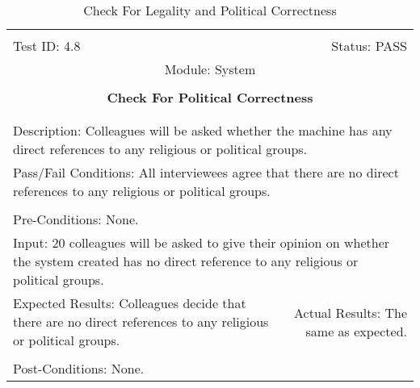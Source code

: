\documentclass[titlepage]{article}
\begin{document}
\begin{center}
\begin{table}[h!]
\begin{tabular}{|l r|}\hline&\\[-2mm]
	Test ID: 4.8	&Status: PASS\\[-3mm]
	\multicolumn{2}{|c|}{Module: System}\\&\\
	\multicolumn{2}{|c|}{\textbf{\large{Check For Political Correctness}}}\\&\\\hline&\\[-3mm]
	\multicolumn{2}{|p{\textwidth}|}{Description: Colleagues will be asked whether the machine has any direct references to any religious or political groups.}\\\hline
	\multicolumn{2}{|p{\textwidth}|}{Pass/Fail Conditions: All interviewees agree that there are no direct references to any religious or political groups.}\\[1mm]\hline&\\[-3mm]
	\multicolumn{2}{|p{\textwidth}|}{Pre-Conditions: None.}\\[4mm]
	\multicolumn{2}{|p{\textwidth}|}{Input: 20 colleagues will be asked to give their opinion on whether the system created has no direct reference to any religious or political groups.}\\[2mm]\hline
	\multicolumn{1}{|p{0.49\textwidth}}{Expected Results: Colleagues decide that there are no direct references to any religious or political groups.}	&\multicolumn{1}{|p{0.45\textwidth}|}{Actual Results: The same as expected.}\\\hline&\\[-3mm]
	\multicolumn{2}{|p{\textwidth}|}{Post-Conditions: None.}\\\hline
\end{tabular}
\caption{Check For Legality and Political Correctness}
\end{table}
\end{center}
\newpage
\end{document}
